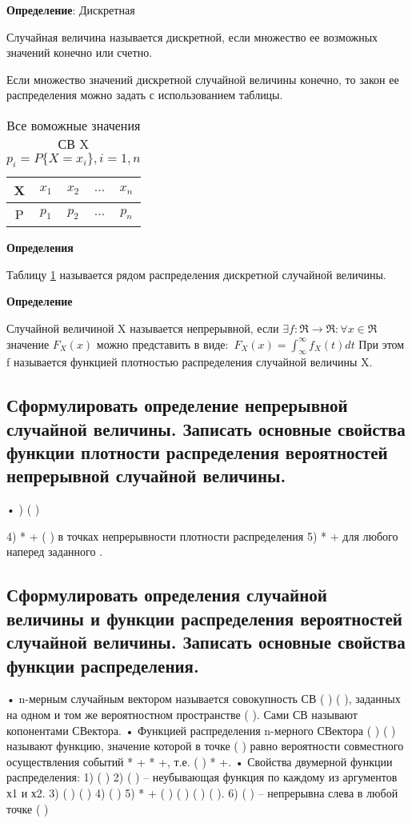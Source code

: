 \textbf{Определение}: Дискретная

Случайная величина называется дискретной, если множество ее возможных значений конечно или счетно.

Если множество значений дискретной случайной величины конечно, то закон ее распределения можно задать с использованием таблицы.
\begin{table}[ht!]
	\begin{center}
		\caption{Все воможные значения СВ X $p_i = P\{X=x_i\}, i = 1,n$}
		\label{tbl:best}
		\begin{tabular}{|c|c|c|c|c|}
			\hline
			X & $x_1$ & $x_2$ & $\dots$ & $x_n$ \\ 
			\hline
			P & $p_1$ & $p_2$ & $\dots$ & $p_n$ \\
			\hline
		\end{tabular}
	\end{center}
\end{table}

\textbf{Определения}

Таблицу \ref{tbl:best} называется рядом распределения дискретной случайной величины.

\textbf{Определение}

Случайной величиной X называется непрерывной, если $\exists f: \Re \rightarrow \Re: \forall x \in \Re$ значение $F_X(x)$ можно представить в виде:\
$F_X(x) = \int_{\infty}^{\infty} f_X(t)dt$ При этом f называется функцией плотностью распределения случайной величины X.

\subsection{Сформулировать определение непрерывной случайной величины. Записать основные свойства функции плотности распределения вероятностей непрерывной случайной величины.}

• ) ( )



4) * + ( ) в точках непрерывности плотности распределения
5) * + для любого наперед заданного . 

\subsection{Сформулировать определения случайной величины и функции распределения вероятностей случайной величины. Записать основные свойства функции распределения.}

• n-мерным случайным вектором называется совокупность СВ
( ) ( ), заданных на одном и том же вероятностном
пространстве ( ). Сами СВ называют копонентами СВектора.
• Функцией распределения n-мерного СВектора (
)
(
) называют функцию, значение которой в точке ( )
равно вероятности совместного осуществления событий *
+ *
+, т.е. (
) *
+.
• Свойства двумерной функции распределения:
1) (
)
2) (
) – неубывающая функция по каждому из аргументов х1 и х2.
3) (
) ( )
4) ( )
5) *
+ (
) (
) (
) (
).
6) (
) – непрерывна слева в любой точке ( )

